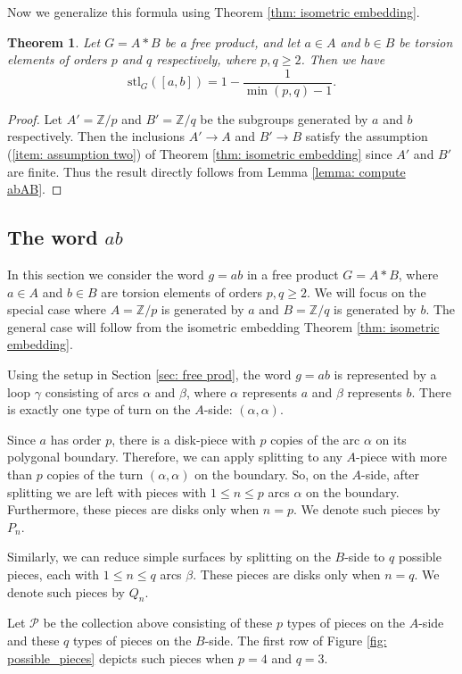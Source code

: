 \documentclass{amsart}
\newtheorem{theorem}{Theorem}[section]
\theoremstyle{definition}
\numberwithin{equation}{section}
\theoremstyle{theorem}
\theoremstyle{remark}
\def\Z{\mathbb Z}
\def\stl{\mathrm{stl}}
\begin{document}
	Now we generalize this formula using Theorem \ref{thm: isometric embedding}.
	\begin{theorem}\label{thm: compute abAB}
	    Let $G=A*B$ be a free product, and let $a\in A$ and $b\in B$ be torsion elements of orders $p$ and $q$ respectively, where $p,q\ge2$. Then we have
	    $$\stl_G([a,b])=1-\frac{1}{\min(p,q)-1}.$$
	\end{theorem}
	\begin{proof}
	    Let $A'=\Z/p$ and $B'=\Z/q$ be the subgroups generated by $a$ and $b$ respectively. Then the inclusions $A'\to A$ and $B'\to B$ satisfy the assumption (\ref{item: assumption two}) of Theorem \ref{thm: isometric embedding} since $A'$ and $B'$ are finite. 
	    Thus the result directly follows from Lemma \ref{lemma: compute abAB}.
	\end{proof}
	
	\subsection{The word $ab$}
	In this section we consider the word $g=ab$ in a free product $G=A*B$, where $a\in A$ and $b\in B$ are torsion elements of orders $p,q\ge2$. We will focus on the special case where $A=\Z/p$ is generated by $a$ and $B=\Z/q$ is generated by $b$. The general case will follow from the isometric embedding Theorem \ref{thm: isometric embedding}.
	
	Using the setup in Section \ref{sec: free prod}, the word $g=ab$ is represented by a loop $\gamma$ consisting of arcs $\alpha$ and $\beta$, where $\alpha$ represents $a$ and $\beta$ represents $b$. There is exactly one type of turn on the $A$-side: $(\alpha,\alpha)$.
	
	Since $a$ has order $p$, there is a disk-piece with $p$ copies of the arc $\alpha$ on its polygonal boundary. Therefore, we can apply splitting to any $A$-piece with more than $p$ copies of the turn $(\alpha,\alpha)$ on the boundary. So, on the $A$-side, after splitting we are left with pieces with $1\leq n \leq p$ arcs $\alpha$ on the boundary. Furthermore, these pieces are disks only when $n=p$. We denote such pieces by $P_n$.  
	
	Similarly, we can reduce simple surfaces by splitting on the $B$-side to $q$ possible pieces, each with $1\leq n \leq q$ arcs $\beta$. These pieces are disks only when $n=q$. We denote such pieces by $Q_n$.
	
	Let $\mathcal{P}$ be the collection above consisting of these $p$ types of pieces on the $A$-side and these $q$ types of pieces on the $B$-side. The first row of Figure \ref{fig: possible_pieces} depicts such pieces when $p=4$ and $q=3$.
	
\end{document}
